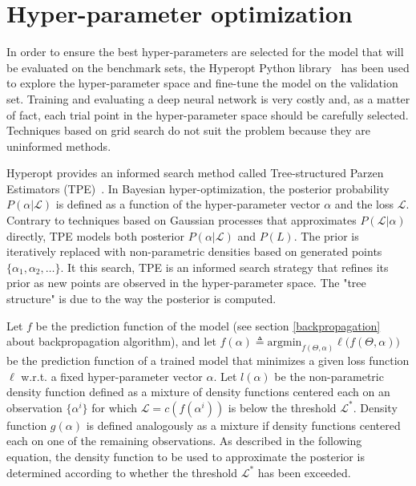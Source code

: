 \section{Hyper-parameter optimization}

  In order to ensure the best hyper-parameters are selected for the model that will be evaluated
  on the benchmark sets, the Hyperopt Python library~\cite{Bergstra_2015} has been used to explore
  the hyper-parameter space and fine-tune the model on the validation set.
  Training and evaluating a deep neural network is very costly and, as a matter of fact,
  each trial point in the hyper-parameter space should be carefully selected. Techniques based
  on grid search do not suit the problem because they are uninformed methods.

  Hyperopt provides an informed search method called Tree-structured Parzen Estimators (TPE)~\cite{bergstra2011algorithms}.
  In Bayesian hyper-optimization, the posterior probability $P(\alpha \vert \mathcal L)$ is defined as a function
  of the hyper-parameter vector $\alpha$ and the loss $\mathcal L$. Contrary to techniques based on Gaussian processes
  that approximates $P(\mathcal L \vert \alpha)$ directly, TPE models both posterior $P(\alpha \vert \mathcal L)$ and $P(L)$.
  The prior is iteratively replaced with non-parametric densities based on generated points $\{ \alpha_1, \alpha_2, \dotsc \}$.
  It this search, TPE is an informed search strategy that refines its prior as new points are observed in the
  hyper-parameter space. The "tree structure" is due to the way the posterior is computed.

  Let $f$ be the prediction function of the model (see section \ref{backpropagation} about backpropagation algorithm),
  and let $f(\alpha) \triangleq \text{argmin}_{f(\Theta, \alpha)} \ell \big(f(\Theta, \alpha)\big)$ be the prediction function  %
  of a trained model that minimizes a given loss function $\ell$ w.r.t. a fixed hyper-parameter vector $\alpha$.
  Let $l(\alpha)$ be the non-parametric density function defined as a mixture of density functions centered each on an
  observation $\{ \alpha^{i} \}$ for which $\mathcal L = c(f(\alpha^{i}))$ is below the threshold $\mathcal L^*$.
  Density function $g(\alpha)$ is defined analogously as a mixture if density functions centered each on one of the
  remaining observations.
  As described in the following equation, the density function to be used to approximate the posterior is
  determined according to whether the threshold $\mathcal L^*$ has been exceeded.

